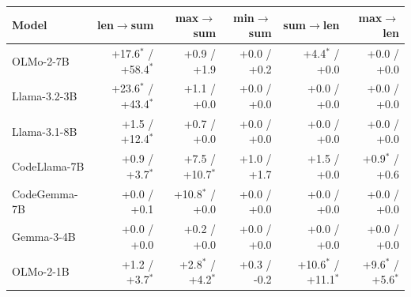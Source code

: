 \begin{tabular}{@{}lrrrrr@{}}
\toprule
Model & len$\to$sum & max$\to$sum & min$\to$sum & sum$\to$len & max$\to$len \\
\midrule
OLMo-2-7B & +17.6$^{*}$ / +58.4$^{*}$ & +0.9 / +1.9 & +0.0 / +0.2 & +4.4$^{*}$ / +0.0 & +0.0 / +0.0 \\
Llama-3.2-3B & +23.6$^{*}$ / +43.4$^{*}$ & +1.1 / +0.0 & +0.0 / +0.0 & +0.0 / +0.0 & +0.0 / +0.0 \\
Llama-3.1-8B & +1.5 / +12.4$^{*}$ & +0.7 / +0.0 & +0.0 / +0.0 & +0.0 / +0.0 & +0.0 / +0.0 \\
CodeLlama-7B & +0.9 / +3.7$^{*}$ & +7.5 / +10.7$^{*}$ & +1.0 / +1.7 & +1.5 / +0.0 & +0.9$^{*}$ / +0.6 \\
CodeGemma-7B & +0.0 / +0.1 & +10.8$^{*}$ / +0.0 & +0.0 / +0.0 & +0.0 / +0.0 & +0.0 / +0.0 \\
Gemma-3-4B & +0.0 / +0.0 & +0.2 / +0.0 & +0.0 / +0.0 & +0.0 / +0.0 & +0.0 / +0.0 \\
OLMo-2-1B & +1.2 / +3.7$^{*}$ & +2.8$^{*}$ / +4.2$^{*}$ & +0.3 / -0.2 & +10.6$^{*}$ / +11.1$^{*}$ & +9.6$^{*}$ / +5.6$^{*}$ \\
\bottomrule
\end{tabular}
